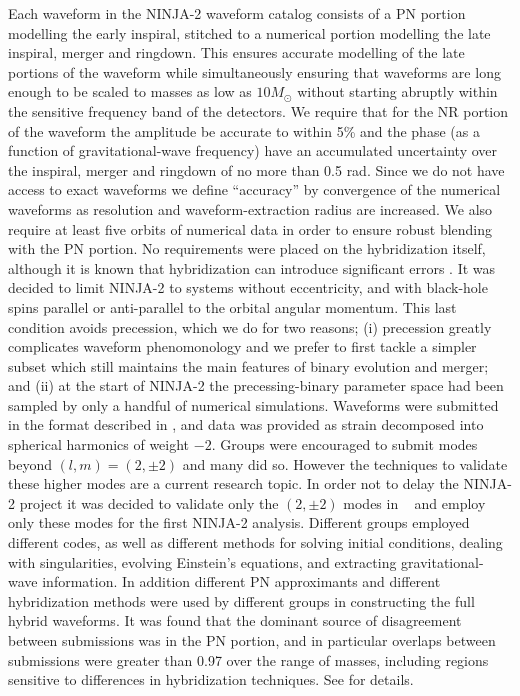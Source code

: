 Each waveform in the NINJA-2 waveform catalog consists of a PN 
portion modelling the early
inspiral, stitched to a numerical portion modelling the late inspiral,
merger and ringdown.  This ensures accurate modelling of the late
portions of the waveform while simultaneously ensuring that waveforms
are long enough to be scaled to masses as low as $10 M_\odot$ without
starting abruptly within the sensitive frequency band of the
detectors.  We require that for the NR portion of the waveform the
amplitude be accurate to within 5\% 
and the phase (as a function of gravitational-wave frequency)
have an accumulated uncertainty over the inspiral, merger and ringdown
of no more than 0.5 rad.  Since we do not have access to exact
waveforms we define ``accuracy'' by convergence of the numerical
waveforms as resolution and waveform-extraction radius are increased.
We also require at least five orbits of numerical data in order to
ensure robust blending with the PN portion.  No requirements were
placed on the hybridization itself, although it is known that
hybridization can introduce significant errors
\cite{MacDonald:2011ne, Santamaria:2010yb, Ohme:2011rm}.
It was
decided to limit NINJA-2 to systems without eccentricity, and with
black-hole spins parallel or anti-parallel
to the orbital angular momentum.  This
last condition avoids precession, which we do for two reasons; (i)
precession greatly complicates waveform phenomonology
and we prefer to first tackle a simpler subset which still maintains
the main features of binary evolution and merger; and (ii) at the
start of NINJA-2 the precessing-binary parameter space had been
sampled by only a handful of numerical simulations.  Waveforms were
submitted in the format described in \cite{Brown:2007jx}, and data was
provided as strain decomposed into spherical harmonics of weight $-2$.
Groups were encouraged to submit modes beyond $(l,m)=(2,\pm 2)$
and many 
did so.  However the techniques to validate these higher modes
are a current research topic.  In order not to delay the NINJA-2
project it was decided to validate only the $(2,\pm 2)$ modes in
~\cite{Ajith:2012az} and employ only these modes for the first
NINJA-2 analysis. Different groups employed different codes, as well
as different methods for solving initial conditions, dealing with
singularities, evolving Einstein's equations, and extracting
gravitational-wave information.  In addition different PN
approximants and different hybridization methods were used by
different groups in constructing the full hybrid waveforms. 
It was found that the
dominant source of disagreement between submissions was in the PN
portion, and in particular overlaps between submissions were greater
than 0.97 over the range of
masses, including regions sensitive to differences in hybridization
techniques.  See
\cite{Ajith:2012az} for details.

